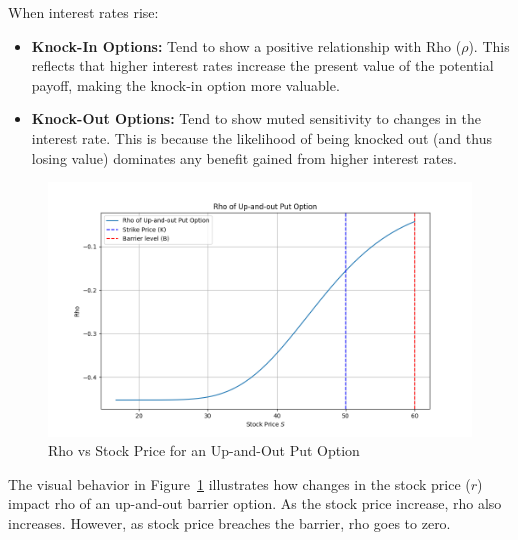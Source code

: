 When interest rates rise:
\begin{itemize}
    \item \textbf{Knock-In Options:} Tend to show a positive relationship with Rho (\(\rho\)). This reflects that higher interest rates increase the present value of the potential payoff, making the knock-in option more valuable.
    \item \textbf{Knock-Out Options:} Tend to show muted sensitivity to changes in the interest rate. This is because the likelihood of being knocked out (and thus losing value) dominates any benefit gained from higher interest rates.
\end{itemize}
\begin{figure}[H]
    \centering
    \includegraphics[width=.65\linewidth]{content/images/rho.png}
    \caption{Rho vs Stock Price for an Up-and-Out Put Option}
    \label{fig:rho_behavior}
\end{figure}

The visual behavior in Figure~\ref{fig:rho_behavior} illustrates how changes in the stock price (\(r\)) impact rho of an up-and-out barrier option. As the stock price increase, rho also increases. However, as stock price breaches the barrier, rho goes to zero.